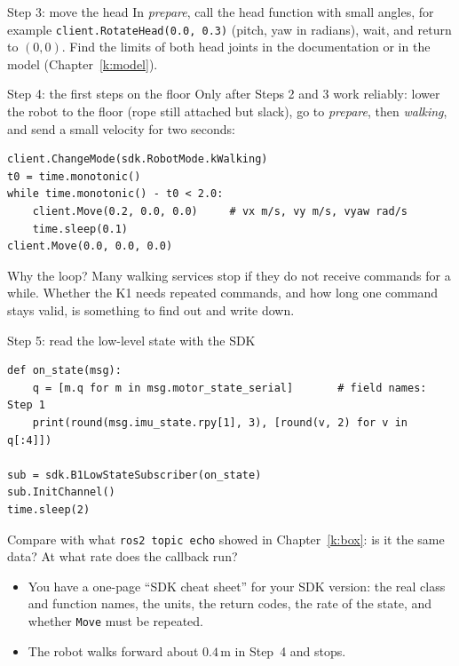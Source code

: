 \begin{stepbox}{Step 3: move the head}
In \emph{prepare}, call the head function with small angles, for example \verb!client.RotateHead(0.0, 0.3)! (pitch, yaw in radians\guess), wait, and return to $(0,0)$. Find the limits of both head joints in the documentation or in the model (Chapter~\ref{k:model}).
\end{stepbox}

\begin{stepbox}{Step 4: the first steps on the floor}
Only after Steps 2 and 3 work reliably: lower the robot to the floor (rope still attached but slack), go to \emph{prepare}, then \emph{walking}, and send a small velocity for two seconds:
\begin{verbatim}
client.ChangeMode(sdk.RobotMode.kWalking)
t0 = time.monotonic()
while time.monotonic() - t0 < 2.0:
    client.Move(0.2, 0.0, 0.0)     # vx m/s, vy m/s, vyaw rad/s
    time.sleep(0.1)
client.Move(0.0, 0.0, 0.0)
\end{verbatim}
Why the loop? Many walking services stop if they do not receive commands for a while\guess. Whether the K1 needs repeated commands, and how long one command stays valid, is something to find out and write down.
\end{stepbox}

\begin{stepbox}{Step 5: read the low-level state with the SDK}
\begin{verbatim}
def on_state(msg):
    q = [m.q for m in msg.motor_state_serial]       # field names: Step 1
    print(round(msg.imu_state.rpy[1], 3), [round(v, 2) for v in q[:4]])

sub = sdk.B1LowStateSubscriber(on_state)
sub.InitChannel()
time.sleep(2)
\end{verbatim}
Compare with what \verb!ros2 topic echo! showed in Chapter~\ref{k:box}: is it the same data? At what rate does the callback run?
\end{stepbox}

\begin{checkbox}
\begin{itemize}[nosep]
  \item You have a one-page ``SDK cheat sheet'' for your SDK version: the real class and function names, the units, the return codes, the rate of the state, and whether \verb!Move! must be repeated.
  \item The robot walks forward about $0.4$\,m in Step~4 and stops.
\end{itemize}
\end{checkbox}

